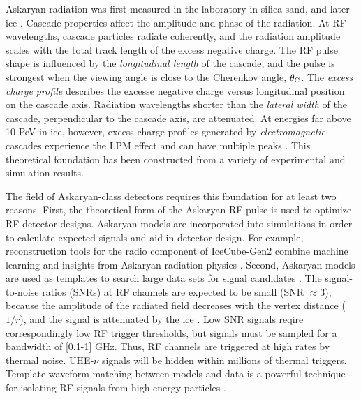\documentclass[amsmath,amssymb,aps,prd,10pt,twocolumn]{revtex4}
\begin{document}
Askaryan radiation was first measured in the laboratory in silica sand, and later ice \cite{saltzberg,10.1103/PhysRevD.74.043002,ask_ice}.  Cascade properties affect the amplitude and phase of the radiation.  At RF wavelengths, cascade particles radiate coherently, and the radiation amplitude scales with the total track length of the excess negative charge.  The RF pulse shape is influenced by the \textit{longitudinal length} of the cascade, and the pulse is strongest when the viewing angle is close to the Cherenkov angle, $\theta_{\rm C}$.  The \textit{excess charge profile} describes the excesse negative charge versus longitudinal position on the cascade axis.  Radiation wavelengths shorter than the \textit{lateral width} of the cascade, perpendicular to the cascade axis, are attenuated.  At energies far above 10 PeV in ice, however, excess charge profiles generated by \textit{electromagnetic} cascades experience the LPM effect and can have multiple peaks \cite{10.1016/j.astropartphys.2009.06.005,10.1103/physrevd.82.074017}.  This theoretical foundation has been constructed from a variety of experimental and simulation results.

The field of Askaryan-class detectors requires this foundation for at least two reasons.  First, the theoretical form of the Askaryan RF pulse is used to optimize RF detector designs.  Askaryan models are incorporated into simulations \cite{dookayka2011characterizing,testbed,10.1140/epjc/s10052-020-7612-8} in order to calculate expected signals and aid in detector design.  For example, reconstruction tools for the radio component of IceCube-Gen2 combine machine learning and insights from Askaryan radiation physics \cite{10.1140/epjc/s10052-019-6971-5,10.1088/1748-0221/15/09/p09039,IFT}.  Second, Askaryan models are used as templates to search large data sets for signal candidates \cite{10.1088/1475-7516/2020/03/053,10.1016/j.astropartphys.2014.09.002}.  The signal-to-noise ratios (SNRs) at RF channels are expected to be small (SNR $\approx 3$), because the amplitude of the radiated field decreases with the vertex distance ($1/r$), and the signal is attenuated by the ice \cite{10.3189/2015jog14j214,Barwick:2018497,ALLISON201963}.  Low SNR signals reqire correspondingly low RF trigger thresholds, but signals must be sampled for a bandwidth of [0.1-1] GHz.  Thus, RF channels are triggered at high rates by thermal noise.  UHE-$\nu$ signals will be hidden within millions of thermal triggers.  Template-waveform matching between models and data is a powerful technique for isolating RF signals from high-energy particles \cite{10.1016/j.astropartphys.2015.04.002,10.1016/j.astropartphys.2014.09.002}.
\end{document}
